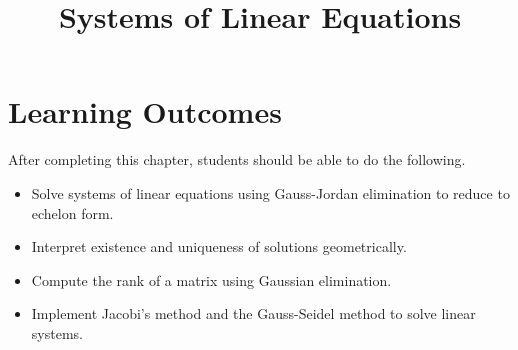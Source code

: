 \documentclass{ximera}
\title{Systems of Linear Equations}
\begin{document}
\begin{abstract}

\end{abstract}
 
\maketitle
 
\section*{Learning Outcomes}
After completing this chapter, students should be able to do the following.
 
\begin{itemize}
    \item Solve systems of linear equations using Gauss-Jordan elimination to reduce to echelon form.
    \item  Interpret existence and uniqueness of solutions geometrically.
    \item  Compute the rank of a matrix using Gaussian elimination.
    \item  Implement Jacobi's method and the Gauss-Seidel method to solve linear systems.

\end{itemize}

 
\end{document}
